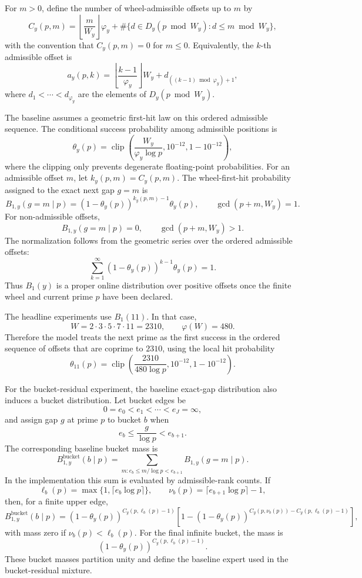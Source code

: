 \documentclass[11pt]{article}
\begin{document}
For $m>0$, define the number of wheel-admissible offsets up to $m$ by
\[
C_y(p,m)=
\left\lfloor\frac{m}{W_y}\right\rfloor\varphi_y
+
\#\{d\in D_y(p\bmod W_y):d\leq m\bmod W_y\},
\]
with the convention that $C_y(p,m)=0$ for $m\leq0$. Equivalently, the $k$-th admissible offset is
\[
a_y(p,k)=
\left\lfloor\frac{k-1}{\varphi_y}\right\rfloor W_y
+d_{((k-1)\bmod\varphi_y)+1},
\]
where $d_1<\cdots<d_{\varphi_y}$ are the elements of $D_y(p\bmod W_y)$.

The baseline assumes a geometric first-hit law on this ordered admissible sequence. The conditional success probability among admissible positions is
\[
\theta_y(p)=\operatorname{clip}\left(\frac{W_y}{\varphi_y\log p},10^{-12},1-10^{-12}\right),
\]
where the clipping only prevents degenerate floating-point probabilities. For an admissible offset $m$, let $k_y(p,m)=C_y(p,m)$. The wheel-first-hit probability assigned to the exact next gap $g=m$ is
\[
B_{1,y}(g=m\mid p)=(1-\theta_y(p))^{k_y(p,m)-1}\theta_y(p),
\qquad \gcd(p+m,W_y)=1.
\]
For non-admissible offsets,
\[
B_{1,y}(g=m\mid p)=0,
\qquad \gcd(p+m,W_y)>1.
\]
The normalization follows from the geometric series over the ordered admissible offsets:
\[
\sum_{k=1}^{\infty}(1-\theta_y(p))^{k-1}\theta_y(p)=1.
\]
Thus $B_1(y)$ is a proper online distribution over positive offsets once the finite wheel and current prime $p$ have been declared.

The headline experiments use $B_1(11)$. In that case,
\[
W=2\cdot3\cdot5\cdot7\cdot11=2310,
\qquad
\varphi(W)=480.
\]
Therefore the model treats the next prime as the first success in the ordered sequence of offsets that are coprime to $2310$, using the local hit probability
\[
\theta_{11}(p)=\operatorname{clip}\left(\frac{2310}{480\log p},10^{-12},1-10^{-12}\right).
\]

For the bucket-residual experiment, the baseline exact-gap distribution also induces a bucket distribution. Let bucket edges be
\[
0=e_0<e_1<\cdots<e_J=\infty,
\]
and assign gap $g$ at prime $p$ to bucket $b$ when
\[
e_b\leq \frac{g}{\log p}<e_{b+1}.
\]
The corresponding baseline bucket mass is
\[
B_{1,y}^{\mathrm{bucket}}(b\mid p)=
\sum_{m:e_b\leq m/\log p<e_{b+1}} B_{1,y}(g=m\mid p).
\]
In the implementation this sum is evaluated by admissible-rank counts. If
\[
\ell_b(p)=\max\{1,\lceil e_b\log p\rceil\},
\qquad
\nu_b(p)=\lceil e_{b+1}\log p\rceil-1,
\]
then, for a finite upper edge,
\[
B_{1,y}^{\mathrm{bucket}}(b\mid p)=
(1-\theta_y(p))^{C_y(p,\ell_b(p)-1)}
\left[1-(1-\theta_y(p))^{C_y(p,\nu_b(p))-C_y(p,\ell_b(p)-1)}\right],
\]
with mass zero if $\nu_b(p)<\ell_b(p)$. For the final infinite bucket, the mass is
\[
(1-\theta_y(p))^{C_y(p,\ell_b(p)-1)}.
\]
These bucket masses partition unity and define the baseline expert used in the bucket-residual mixture.
\end{document}
